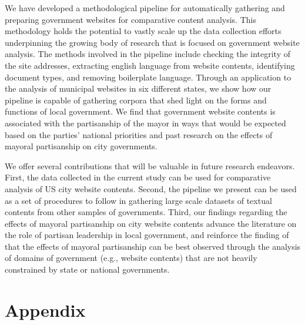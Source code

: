 \documentclass[11pt]{article}
\begin{document}

We have developed a methodological pipeline for automatically gathering and preparing government websites for comparative content analysis. This methodology holds the potential to vastly scale up the data collection efforts underpinning the growing body of research that is focused on government website analysis. The methods involved in the pipeline include checking the integrity of the site addresses, extracting english language from website contents, identifying document types, and removing boilerplate language. Through an application to the analysis of municipal websites in six different states, we show how our pipeline is capable of gathering corpora that shed light on the forms and functions of local government. We find that government website contents is associated with the partisanship of the mayor in ways that would be expected based on the parties' national priorities and past research on the effects of mayoral partisanship on city governments.

We offer several contributions that will be valuable in future research endeavors. First, the data collected in the current study can be used for comparative analysis of US city website contents. Second, the pipeline we present can be used as a set of procedures to follow in gathering large scale datasets of textual contents from other samples of governments. Third, our findings regarding the effects of mayoral partisanship on city website contents advance the literature on the role of partisan leadership in local government, and reinforce the finding of \citet{gerber2011mayors} that the effects of mayoral partisanship can be best observed through the analysis of domains of government (e.g., website contents) that are not heavily constrained by state or national governments.


%
%

\newpage

%


\newpage
\section*{Appendix}




\end{document}

